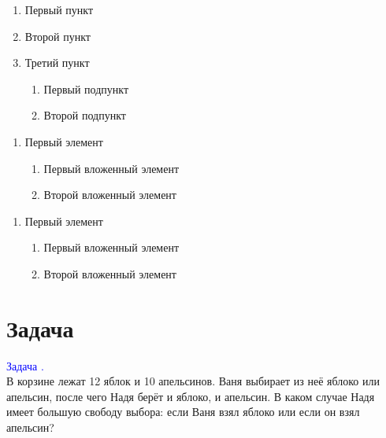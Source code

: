 \documentclass[12pt, a4paper]{article}
\theoremstyle{plain}              %
\theoremstyle{definition}         %
\begin{document}
\begin{enumerate}
	\renewcommand{\labelenumi}{\Roman{enumi}}
	\renewcommand{\labelenumii}{\asbuk{enumii}}
\item Первый пункт
\item Второй пункт
\item Третий пункт
\begin{enumerate}
\item Первый подпункт
\item Второй подпункт
\end{enumerate}
\end{enumerate}


\begin{enumerate}
\item Первый элемент
  \begin{enumerate}
  \item Первый вложенный элемент
  \item Второй вложенный элемент
  \end{enumerate}
\end{enumerate}

\renewcommand{\labelenumi}{\arabic{enumi}}
\renewcommand{\labelenumii}{\arabic{enumi}.\arabic{enumii}}

\begin{enumerate}
\item Первый элемент
  \begin{enumerate}
  \item Первый вложенный элемент
  \item Второй вложенный элемент
  \end{enumerate}
\end{enumerate}



\section{Задача}

\newcommand{\ex}[1]{%
\addtocounter{i}{1}    %
\textcolor{blue}{Задача \thesection.\\}
#1\\
}


\ex{В корзине лежат 12 яблок и 10 апельсинов. Ваня выбирает из неё яблоко или апельсин, после чего Надя берёт и яблоко, и апельсин. В каком случае Надя имеет большую свободу выбора: если Ваня взял яблоко или если он взял апельсин?}
\end{document}
